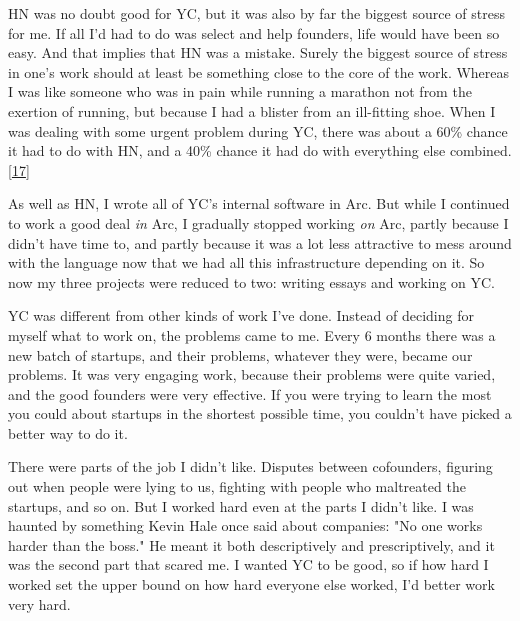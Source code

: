 HN
                  was no doubt good for YC, but it was also by far the biggest
                  source of stress for me. If all I'd had to do was select and
                  help founders, life would have been so easy. And that implies
                  that HN was a mistake. Surely the biggest source of stress in
                  one's work should at least be something close to the core of
                  the work. Whereas I was like someone who was in pain while
                  running a marathon not from the exertion of running, but
                  because I had a blister from an ill-fitting shoe. When I was
                  dealing with some urgent problem during YC, there was about a
                  60\% chance it had to do with HN, and a 40\% chance it had do
                  with everything else combined.
                  [\href{\#f17n}{17}]

As well as HN, I wrote all of YC's internal
                  software in Arc. But while I continued to work a good deal
                  \emph{in} Arc, I gradually stopped working \emph{on} Arc,
                  partly because I didn't have time to, and partly because it
                  was a lot less attractive to mess around with the language now
                  that we had all this infrastructure depending on it. So now my
                  three projects were reduced to two: writing essays and working
                  on YC.

YC was different from other kinds of work
                  I've done. Instead of deciding for myself what to work on, the
                  problems came to me. Every 6 months there was a new batch of
                  startups, and their problems, whatever they were, became our
                  problems. It was very engaging work, because their problems
                  were quite varied, and the good founders were very effective.
                  If you were trying to learn the most you could about startups
                  in the shortest possible time, you couldn't have picked a
                  better way to do it.

There were parts of the job I
                  didn't like. Disputes between cofounders, figuring out when
                  people were lying to us, fighting with people who maltreated
                  the startups, and so on. But I worked hard even at the parts I
                  didn't like. I was haunted by something Kevin Hale once said
                  about companies: "No one works harder than the boss." He meant
                  it both descriptively and prescriptively, and it was the
                  second part that scared me. I wanted YC to be good, so if how
                  hard I worked set the upper bound on how hard everyone else
                  worked, I'd better work very hard.

